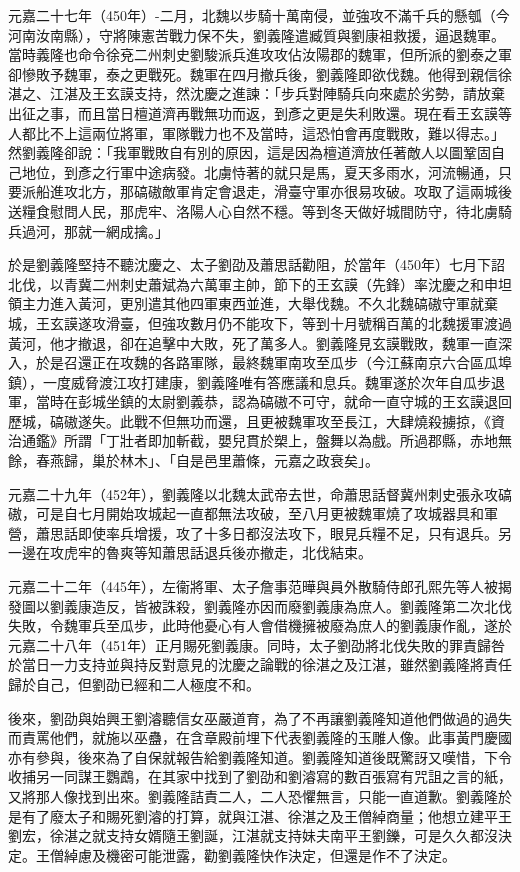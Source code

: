 元嘉二十七年（450年）-二月，北魏以步騎十萬南侵，並強攻不滿千兵的懸瓠（今河南汝南縣），守將陳憲苦戰力保不失，劉義隆遣臧質與劉康祖救援，逼退魏軍。當時義隆也命令徐兗二州刺史劉駿派兵進攻攻佔汝陽郡的魏軍，但所派的劉泰之軍卻慘敗予魏軍，泰之更戰死。魏軍在四月撤兵後，劉義隆即欲伐魏。他得到親信徐湛之、江湛及王玄謨支持，然沈慶之進諫：「步兵對陣騎兵向來處於劣勢，請放棄出征之事，而且當日檀道濟再戰無功而返，到彥之更是失利敗還。現在看王玄謨等人都比不上這兩位將軍，軍隊戰力也不及當時，這恐怕會再度戰敗，難以得志。」然劉義隆卻說：「我軍戰敗自有別的原因，這是因為檀道濟放任著敵人以圖鞏固自己地位，到彥之行軍中途病發。北虜恃著的就只是馬，夏天多雨水，河流暢通，只要派船進攻北方，那碻磝敵軍肯定會退走，滑臺守軍亦很易攻破。攻取了這兩城後送糧食慰問人民，那虎牢、洛陽人心自然不穩。等到冬天做好城間防守，待北虜騎兵過河，那就一網成擒。」

於是劉義隆堅持不聽沈慶之、太子劉劭及蕭思話勸阻，於當年（450年）七月下詔北伐，以青冀二州刺史蕭斌為六萬軍主帥，節下的王玄謨（先鋒）率沈慶之和申坦領主力進入黃河，更別遣其他四軍東西並進，大舉伐魏。不久北魏碻磝守軍就棄城，王玄謨遂攻滑臺，但強攻數月仍不能攻下，等到十月號稱百萬的北魏援軍渡過黃河，他才撤退，卻在追擊中大敗，死了萬多人。劉義隆見玄謨戰敗，魏軍一直深入，於是召還正在攻魏的各路軍隊，最終魏軍南攻至瓜步（今江蘇南京六合區瓜埠鎮），一度威脅渡江攻打建康，劉義隆唯有答應議和息兵。魏軍遂於次年自瓜步退軍，當時在彭城坐鎮的太尉劉義恭，認為碻磝不可守，就命一直守城的王玄謨退回歷城，碻磝遂失。此戰不但無功而還，且更被魏軍攻至長江，大肆燒殺擄掠，《資治通鑑》所謂「丁壯者即加斬截，嬰兒貫於槊上，盤舞以為戲。所過郡縣，赤地無餘，春燕歸，巢於林木」、「自是邑里蕭條，元嘉之政衰矣」。

元嘉二十九年（452年），劉義隆以北魏太武帝去世，命蕭思話督冀州刺史張永攻碻磝，可是自七月開始攻城起一直都無法攻破，至八月更被魏軍燒了攻城器具和軍營，蕭思話即使率兵增援，攻了十多日都沒法攻下，眼見兵糧不足，只有退兵。另一邊在攻虎牢的魯爽等知蕭思話退兵後亦撤走，北伐結束。

元嘉二十二年（445年），左衞將軍、太子詹事范曄與員外散騎侍郎孔熙先等人被揭發圖以劉義康造反，皆被誅殺，劉義隆亦因而廢劉義康為庶人。劉義隆第二次北伐失敗，令魏軍兵至瓜步，此時他憂心有人會借機擁被廢為庶人的劉義康作亂，遂於元嘉二十八年（451年）正月賜死劉義康。同時，太子劉劭將北伐失敗的罪責歸咎於當日一力支持並與持反對意見的沈慶之論戰的徐湛之及江湛，雖然劉義隆將責任歸於自己，但劉劭已經和二人極度不和。

後來，劉劭與始興王劉濬聽信女巫嚴道育，為了不再讓劉義隆知道他們做過的過失而責罵他們，就施以巫蠱，在含章殿前埋下代表劉義隆的玉雕人像。此事黃門慶國亦有參與，後來為了自保就報告給劉義隆知道。劉義隆知道後既驚訝又嘆惜，下令收捕另一同謀王鸚鵡，在其家中找到了劉劭和劉濬寫的數百張寫有咒詛之言的紙，又將那人像找到出來。劉義隆詰責二人，二人恐懼無言，只能一直道歉。劉義隆於是有了廢太子和賜死劉濬的打算，就與江湛、徐湛之及王僧綽商量；他想立建平王劉宏，徐湛之就支持女婿隨王劉誕，江湛就支持妹夫南平王劉鑠，可是久久都沒決定。王僧綽慮及機密可能泄露，勸劉義隆快作決定，但還是作不了決定。

